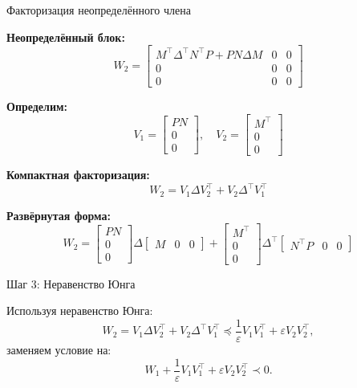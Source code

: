 \documentclass{beamer}
\begin{document}
\begin{frame}{Факторизация неопределённого члена}
	\begin{flushleft}
		
		
		
		\textbf{Неопределённый блок:}
		\[
		W_2 =
		\begin{bmatrix}
			M^\top \Delta^\top N^\top P + PN \Delta M & 0 & 0 \\
			0 & 0 & 0 \\
			0 & 0 & 0
		\end{bmatrix}
		\]
		
		\medskip
		
		\textbf{Определим:}
		\[
		V_1 =
		\begin{bmatrix}
			PN \\ 0 \\ 0
		\end{bmatrix},
		\quad
		V_2 =
		\begin{bmatrix}
			M^\top \\ 0 \\ 0
		\end{bmatrix}
		\]
		
		\medskip
		
		\textbf{Компактная факторизация:}
		\[
		W_2 = V_1 \Delta V_2^\top + V_2 \Delta^\top V_1^\top
		\]
		
		\medskip
		
		\textbf{Развёрнутая форма:}
		\[
		W_2 =
		\begin{bmatrix}
			PN \\ 0 \\ 0
		\end{bmatrix}
		\Delta
		\begin{bmatrix}
			M & 0 & 0
		\end{bmatrix}
		+
		\begin{bmatrix}
			M^\top \\ 0 \\ 0
		\end{bmatrix}
		\Delta^\top
		\begin{bmatrix}
			N^\top P & 0 & 0
		\end{bmatrix}
		\]
		
	\end{flushleft}
	
\end{frame}

\begin{frame}{Шаг 3: Неравенство Юнга}
	\begin{flushleft}
		
		
		Используя неравенство Юнга:
		\[
		W_2 = V_1 \Delta V_2^\top + V_2 \Delta^\top V_1^\top \preceq \frac{1}{\varepsilon} V_1 V_1^\top + \varepsilon V_2 V_2^\top,
		\]
		заменяем условие на:
		\[
		W_1 + \frac{1}{\varepsilon} V_1 V_1^\top + \varepsilon V_2 V_2^\top \prec 0.
		\]
		
		
	\end{flushleft}
\end{frame}
\end{document}
